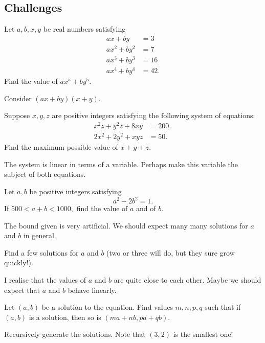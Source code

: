 \documentclass[../jarvis.tex]{subfiles}
\begin{document}
\subsection{Challenges}
\problem[1990 AIME P15]Let $a,b,x,y$ be real numbers satisfying
\begin{align*}
    ax+by&=3 \\
    ax^2+by^2&=7 \\
    ax^3+by^3&=16 \\
    ax^4+by^4&=42.
\end{align*}
Find the value of $ax^5+by^5$.
\begin{hints}
    \begin{hint}
        Consider $(ax+by)(x+y)$.
    \end{hint}
\end{hints}
\problem[2019 SMO(S) P16]Suppose $x,y,z$ are positive integers satisfying the following system of equations:
\begin{align*}
    x^2z+y^2z+8xy&=200,\\
    2x^2+2y^2+xyz&=50.
\end{align*}
Find the maximum possible value of $x+y+z$.
\begin{hints}
    \begin{hint}
        The system is linear in terms of a variable. Perhaps make this variable the subject of both equations.
    \end{hint}
\end{hints}
\problem[2019 SMO(S) P25]Let $a,b$ be positive integers satisfying
$$a^2-2b^2=1.$$
If $500<a+b<1000,$ find the value of $a$ and of $b$.
\begin{hints}
    \begin{hint}
        The bound given is very artificial. We should expect many many solutions for $a$ and $b$ in general.
    \end{hint}
    \begin{hint}
        Find a few solutions for $a$ and $b$ (two or three will do, but they sure grow quickly!).
    \end{hint}
    \begin{hint}
        I realise that the values of $a$ and $b$ are quite close to each other. Maybe we should expect that $a$ and $b$ behave linearly. 
    \end{hint}
    \begin{hint}
        Let $(a,b)$ be a solution to the equation. Find values $m,n,p,q$ such that if $(a,b)$ is a solution, then so is $(ma+nb,pa+qb)$.
    \end{hint}
    \begin{hint}
        Recursively generate the solutions. Note that $(3,2)$ is the smallest one!
    \end{hint}
\end{hints}
\end{document}
